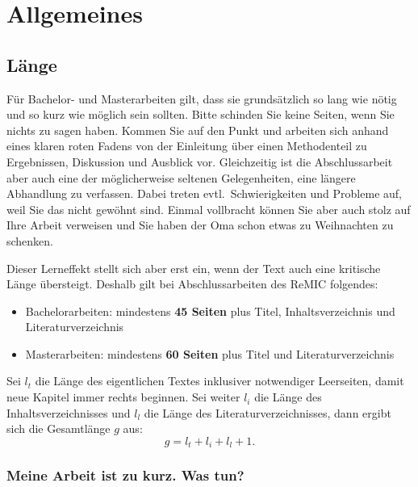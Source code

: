 
\chapter{Allgemeines}
\label{allgemeines}

\section{Länge}
\label{laenge}

Für Bachelor- und Masterarbeiten gilt, dass sie grundsätzlich so lang wie nötig und so kurz wie möglich sein sollten.
Bitte schinden Sie keine Seiten, wenn Sie nichts zu sagen haben.
Kommen Sie auf den Punkt und arbeiten sich anhand eines klaren roten Fadens von der Einleitung über einen Methodenteil zu Ergebnissen, Diskussion und Ausblick vor.
Gleichzeitig ist die Abschlussarbeit aber auch eine der möglicherweise seltenen Gelegenheiten, eine längere Abhandlung zu verfassen.
Dabei treten evtl.~Schwierigkeiten und Probleme auf, weil Sie das nicht gewöhnt sind.
Einmal vollbracht können Sie aber auch stolz auf Ihre Arbeit verweisen und Sie haben der Oma schon etwas zu Weihnachten zu schenken.

Dieser Lerneffekt stellt sich aber erst ein, wenn der Text auch eine kritische Länge übersteigt.
Deshalb gilt bei Abschlussarbeiten des ReMIC folgendes:
\begin{itemize}
\item Bachelorarbeiten: mindestens \textbf{45 Seiten} plus Titel, Inhaltsverzeichnis und Literaturverzeichnis
\item Masterarbeiten: mindestens \textbf{60 Seiten} plus Titel und Literaturverzeichnis
\end{itemize}
Sei $l_t$ die Länge des eigentlichen Textes inklusiver notwendiger Leerseiten, damit neue Kapitel immer rechts beginnen.
Sei weiter $l_i$ die Länge des Inhaltsverzeichnisses und  $l_l$ die Länge des Literaturverzeichnisses, dann ergibt sich die Gesamtlänge $g$ aus:
\begin{equation}
g = l_t + l_i + l_l + 1.
\label{gleichung laenge}
\end{equation}

\subsection{Meine Arbeit ist zu kurz. Was tun?}\label{zuKurz}

